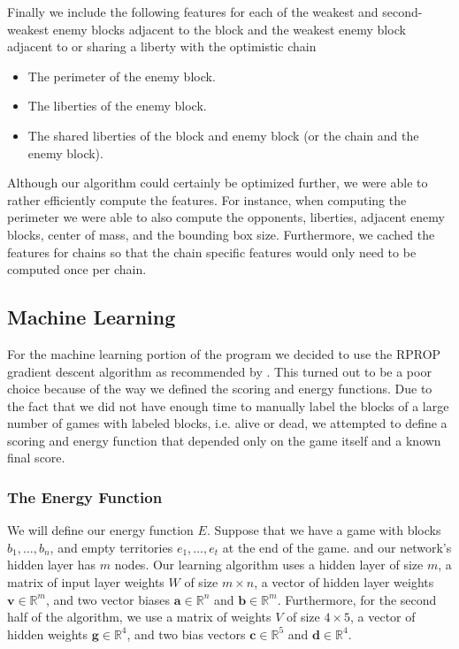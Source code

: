 \documentclass[11pt,letterpaper]{article}
\begin{document}
Finally we include the following features for each of the weakest and second-weakest enemy blocks adjacent to
the block and
the weakest enemy block adjacent to or sharing a liberty with the optimistic chain
\begin{itemize}
  \item The perimeter of the enemy block.
  \item The liberties of the enemy block.
  \item The shared liberties of the block and enemy block (or the chain and the enemy block).
\end{itemize}

Although our algorithm could certainly be optimized further, we were able to rather efficiently compute the features.
For instance, when computing the perimeter we were able to also compute the opponents, liberties, adjacent enemy
blocks, center of mass, and the bounding box size. Furthermore, we cached the features for chains so that the
chain specific features would only need to be computed once per chain.

\subsection{Machine Learning}

For the machine learning portion of the program we decided to use the RPROP gradient descent algorithm as
recommended by \cite{WHU:04}. This turned out to be a poor choice because of the way we defined the scoring and
energy functions. Due to the fact that we did not have enough time to manually label the blocks of a large number
of games with labeled blocks, i.e. alive or dead, we attempted to define a scoring and energy function that
depended only on the game itself and a known final score.

\subsubsection{The Energy Function}

\def\v#1{\mathbf{#1}}
\def\touches#1#2{\mbox{tchs}_{#1}{\left(#2\right)}}
\def\color#1{\mbox{clr}{\left(#1\right)}}
\def\colorp#1{\mbox{clr}^*{\left(#1\right)}}
\def\size#1{\mbox{size}{\left(#1\right)}}

We will define our energy function $E$. Suppose that we have a game with blocks $b_1, \ldots, b_n$, and empty
territories $e_1, \ldots, e_t$ at the end of the game.  and our network's hidden layer has $m$ nodes. Our learning
algorithm uses a hidden layer of size $m$, a matrix of input layer weights $W$ of size $m \times n$, a vector of
hidden layer weights $\v{ v } \in \mathbb{ R }^m$, and two vector biases $\v{ a } \in \mathbb{ R }^n$ and
$\v{ b } \in \mathbb{ R }^m$. Furthermore, for the second half of the algorithm, we use a matrix of weights $V$ of size
$4 \times 5$, a vector of hidden weights $\v{ g } \in \mathbb{ R }^4$, and two bias vectors $\v{ c } \in \mathbb{ R }^5$
and $\v{ d } \in \mathbb{ R }^4$.
\end{document}
